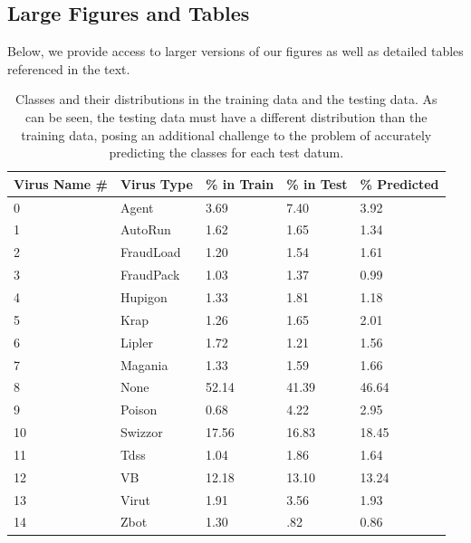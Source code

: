 \documentclass[letterpaper]{article}
\begin{document}
\onecolumn

\subsection{Large Figures and Tables}
Below, we provide access to larger versions of our figures as well as detailed tables referenced in the text.

\begin{table}[h!]
\begin{center}
    \begin{tabular}{ | p{1cm} | p{2cm} | p{1cm} | p{1cm} | p{1cm} |}
    \hline
    Virus Name \# & Virus Type & \% in Train & \% in Test & \% Predicted \\ \hline
    0 & Agent & 3.69 & 7.40 & 3.92 \\ \hline
    1 & AutoRun & 1.62 & 1.65 & 1.34 \\ \hline
    2 & FraudLoad & 1.20 & 1.54 & 1.61 \\ \hline
    3 & FraudPack & 1.03 & 1.37 & 0.99 \\ \hline 
    4 & Hupigon & 1.33 & 1.81& 1.18 \\ \hline
    5 & Krap & 1.26 & 1.65 & 2.01 \\ \hline
    6 & Lipler & 1.72 & 1.21 & 1.56 \\ \hline 
    7 & Magania & 1.33 & 1.59 & 1.66 \\ \hline 
    8 & None & 52.14 & 41.39 & 46.64\\ \hline
    9 & Poison & 0.68 & 4.22 & 2.95\\ \hline
    10 & Swizzor & 17.56 & 16.83 & 18.45\\ \hline
    11 & Tdss & 1.04 & 1.86  &1.64 \\ \hline
    12 & VB & 12.18 & 13.10 & 13.24 \\ \hline
    13 & Virut & 1.91 & 3.56 & 1.93\\ \hline 
   	14 & Zbot & 1.30 & .82 & 0.86 \\ \hline 
    \end{tabular}
    \caption{Classes and their distributions in the training data and the testing data. As can be seen, the testing data must have a different distribution than the training data, posing an additional challenge to the problem of accurately predicting the classes for each test datum.}
    \label{tab:virus_classes}
\end{center}
\end{table}
\end{document}

